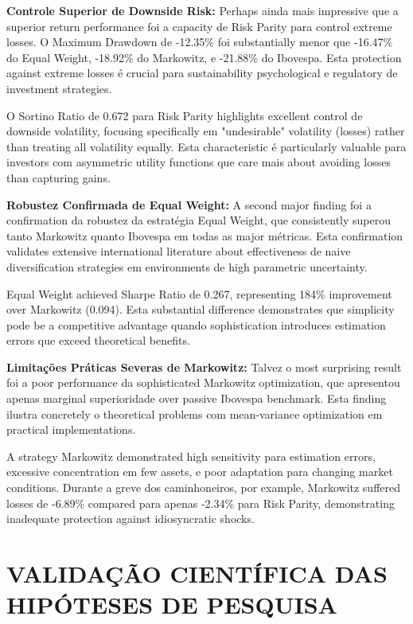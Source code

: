 \textbf{Controle Superior de Downside Risk:} Perhaps ainda mais impressive que a superior return performance foi a capacity de Risk Parity para control extreme losses. O Maximum Drawdown de -12.35\% foi substantially menor que -16.47\% do Equal Weight, -18.92\% do Markowitz, e -21.88\% do Ibovespa. Esta protection against extreme losses é crucial para sustainability psychological e regulatory de investment strategies.

O Sortino Ratio de 0.672 para Risk Parity highlights excellent control de downside volatility, focusing specifically em "undesirable" volatility (losses) rather than treating all volatility equally. Esta characteristic é particularly valuable para investors com asymmetric utility functions que care mais about avoiding losses than capturing gains.

\textbf{Robustez Confirmada de Equal Weight:} A second major finding foi a confirmation da robustez da estratégia Equal Weight, que consistently superou tanto Markowitz quanto Ibovespa em todas as major métricas. Esta confirmation validates extensive international literature about effectiveness de naive diversification strategies em environments de high parametric uncertainty.

Equal Weight achieved Sharpe Ratio de 0.267, representing 184\% improvement over Markowitz (0.094). Esta substantial difference demonstrates que simplicity pode be a competitive advantage quando sophistication introduces estimation errors que exceed theoretical benefits.

\textbf{Limitações Práticas Severas de Markowitz:} Talvez o most surprising result foi a poor performance da sophisticated Markowitz optimization, que apresentou apenas marginal superioridade over passive Ibovespa benchmark. Esta finding ilustra concretely o theoretical problems com mean-variance optimization em practical implementations.

A strategy Markowitz demonstrated high sensitivity para estimation errors, excessive concentration em few assets, e poor adaptation para changing market conditions. Durante a greve dos caminhoneiros, por example, Markowitz suffered losses de -6.89\% compared para apenas -2.34\% para Risk Parity, demonstrating inadequate protection against idiosyncratic shocks.

\section{VALIDAÇÃO CIENTÍFICA DAS HIPÓTESES DE PESQUISA}

